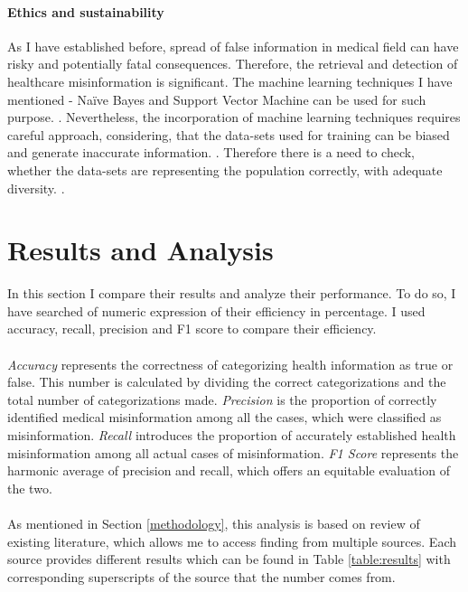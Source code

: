 \documentclass[11pt ,english,a4paper]{article}
\begin{document}
\paragraph{Ethics and sustainability}%
As I have established before, spread of false information in medical field can have risky and potentially fatal consequences. Therefore, the retrieval and detection of healthcare misinformation is significant. The machine learning techniques I have mentioned - Naïve Bayes and Support Vector Machine can be used for such purpose. \cite{chap22unmask}. Nevertheless, the incorporation of machine learning techniques requires careful approach, considering, that the data-sets used for training can be biased and generate inaccurate information. \cite{who21ethics}. Therefore there is a need to check, whether the data-sets are representing the population correctly, with adequate diversity. \cite{sch23aut}.

\section{Results and Analysis}\label{analysis}
In this section I compare their results and analyze their performance. To do so, I have searched of numeric expression of their efficiency in percentage. I used accuracy, recall, precision and F1 score to compare their efficiency. 

\paragraph{} \emph{Accuracy} represents the correctness of categorizing health information as true or false. This number is calculated by dividing the correct categorizations and the total number of categorizations made. \emph{Precision} is the proportion of correctly identified medical misinformation among all the cases, which were classified as misinformation. \emph{Recall} introduces the proportion of accurately established health misinformation among all actual cases of misinformation. \emph{F1 Score} represents the harmonic average of precision and recall, which offers an equitable evaluation of the two. \cite{aph18detect}

\paragraph{} As mentioned in Section \ref{methodology}, this analysis is based on review of existing literature, which allows me to access finding from multiple sources. Each source provides different results which can be found in Table \ref{table:results} with corresponding superscripts of the source that the number comes from. 
\end{document}
